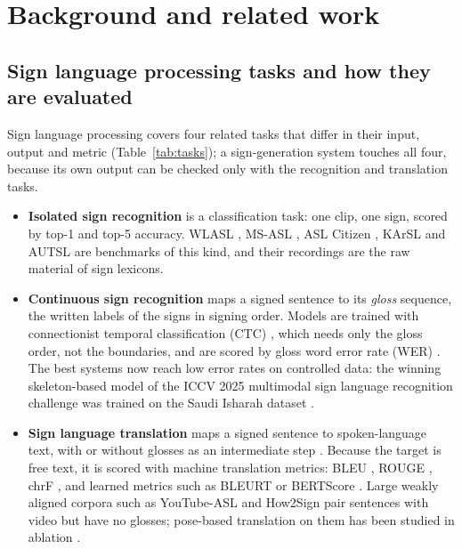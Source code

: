 \chapter{Background and related work}
\label{sec:related}

\section{Sign language processing tasks and how they are evaluated}
Sign language processing covers four related tasks that differ in their input, output and metric
(Table~\ref{tab:tasks}); a sign-generation system touches all four, because its own output can be checked only with the
recognition and translation tasks.

\begin{itemize}[leftmargin=*,itemsep=2pt]
  \item \textbf{Isolated sign recognition} is a classification task: one clip, one sign, scored by top-1 and top-5
        accuracy. WLASL \cite{wlasl}, MS-ASL \cite{msasl}, ASL Citizen \cite{aslcitizen}, KArSL \cite{karsl} and AUTSL
        \cite{autsl} are benchmarks of this kind, and their recordings are the raw material of sign lexicons.
  \item \textbf{Continuous sign recognition} maps a signed sentence to its \emph{gloss} sequence, the written labels of
        the signs in signing order. Models are trained with connectionist temporal classification (CTC) \cite{ctc},
        which needs only the gloss order, not the boundaries, and are scored by gloss word error rate (WER)
        \cite{koller2015,kollersurvey}. The best systems now reach low error rates on controlled data: the winning
        skeleton-based model of the ICCV 2025 multimodal sign language recognition challenge \cite{mslr2025,signeval2025}
        was trained on the Saudi Isharah dataset \cite{isharah}.
  \item \textbf{Sign language translation} maps a signed sentence to spoken-language text, with or without glosses as an
        intermediate step \cite{camgoz2018,signlanguagetransformers}. Because the target is free text, it is scored with
        machine translation metrics: BLEU \cite{bleu}, ROUGE \cite{rouge}, chrF \cite{chrf}, and learned metrics such as
        BLEURT \cite{bleurt} or BERTScore \cite{bertscore}. Large weakly aligned corpora such as YouTube-ASL
        \cite{youtubeasl} and How2Sign \cite{how2sign} pair sentences with video but have no glosses; pose-based
        translation on them has been studied in ablation \cite{t5slt}.

\end{itemize}
